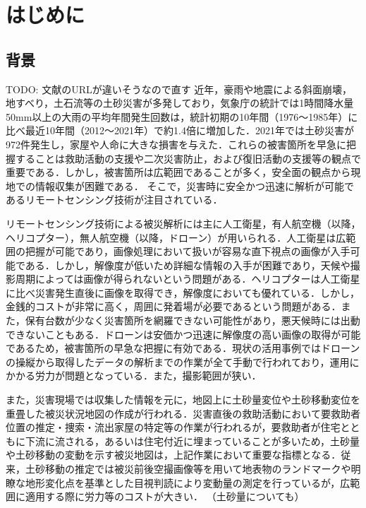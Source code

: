 \chapter{はじめに}
  \section{背景}
  TODO: 文献のURLが違いそうなので直す
    近年，豪雨や地震による斜面崩壊，地すべり，土石流等の土砂災害が多発しており，気象庁の統計では1時間降水量50mm以上の大雨の平均年間発生回数は，統計初期の10年間（1976〜1985年）に比べ最近10年間（2012〜2021年）で約1.4倍に増加した\cite{背景1}．2021年では土砂災害が972件発生し，家屋や人命に大きな損害を与えた\cite{背景2}．これらの被害箇所を早急に把握することは救助活動の支援や二次災害防止，および復旧活動の支援等の観点で重要である\cite{}．しかし，被害箇所は広範囲であることが多く，安全面の観点から現地での情報収集が困難である．
    そこで，災害時に安全かつ迅速に解析が可能であるリモートセンシング技術が注目されている\cite{}．

    リモートセンシング技術による被災解析には主に人工衛星，有人航空機（以降，ヘリコプター），無人航空機（以降，ドローン）が用いられる．人工衛星は広範囲の把握が可能であり，画像処理において扱いが容易な直下視点の画像が入手可能である．しかし，解像度が低いため詳細な情報の入手が困難であり，天候や撮影周期によっては画像が得られないという問題がある．ヘリコプターは人工衛星に比べ災害発生直後に画像を取得でき，解像度においても優れている．しかし，金銭的コストが非常に高く，周囲に発着場が必要であるという問題がある．また，保有台数が少なく災害箇所を網羅できない可能性があり，悪天候時には出動できないこともある．ドローンは安価かつ迅速に解像度の高い画像の取得が可能であるため，被害箇所の早急な把握に有効である．現状の活用事例ではドローンの操縦から取得したデータの解析までの作業が全て手動で行われており，運用にかかる労力が問題となっている．また，撮影範囲が狭い．

    また，災害現場では収集した情報を元に，地図上に土砂量変位や土砂移動変位を重畳した被災状況地図の作成が行われる．災害直後の救助活動において要救助者位置の推定・捜索・流出家屋の特定等の作業が行われるが，要救助者が住宅とともに下流に流される，あるいは住宅付近に埋まっていることが多いため，土砂量や土砂移動の変動を示す被災地図は，上記作業において重要な指標となる．従来，土砂移動の推定では被災前後空撮画像等を用いて地表物のランドマークや明瞭な地形変化点を基準とした目視判読により変動量の測定を行っているが\cite{先行研究1}，広範囲に適用する際に労力等のコストが大きい．
    （土砂量についても）

